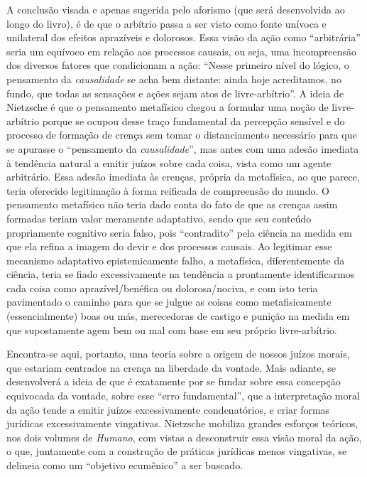 \documentclass[
	12pt,				%
	openright,			%
	oneside,			%
	a4paper,			%
	english,			%
	french,				%
	spanish,			%
	brazil				%
	]{abntex2}
\begin{document}
A conclusão visada e apenas sugerida pelo aforismo (que será desenvolvida ao longo do livro), é de que o arbítrio passa a ser visto como fonte unívoca e unilateral dos efeitos aprazíveis e dolorosos. Essa visão da ação como “arbitrária” seria um equívoco em relação aos processos causais, ou seja, uma incompreensão dos diversos fatores que condicionam a ação: “Nesse primeiro nível do lógico, o pensamento da \textit{causalidade} se acha bem distante: ainda hoje acreditamos, no fundo, que todas as sensações e ações sejam atos de livre-arbítrio”. A ideia de Nietzsche é que o pensamento metafísico chegou a formular uma noção de livre-arbítrio porque se ocupou desse traço fundamental da percepção sensível e do processo de formação de crença sem tomar o distanciamento necessário para que se apurasse o “pensamento da \textit{causalidade}”, mas antes com uma adesão imediata à tendência natural a emitir juízos sobre cada coisa, vista como um agente arbitrário. Essa adesão imediata às crenças, própria da metafísica, ao que parece, teria oferecido legitimação à forma reificada de compreensão do mundo. O pensamento metafísico não teria dado conta do fato de que as crenças assim formadas teriam valor meramente adaptativo, sendo que seu conteúdo propriamente cognitivo seria falso, pois “contradito” pela ciência na medida em que ela refina a imagem do devir e dos processos causais. Ao legitimar esse mecanismo adaptativo epistemicamente falho, a metafísica, diferentemente da ciência, teria se fiado excessivamente na tendência a prontamente identificarmos cada coisa como aprazível/benéfica ou dolorosa/nociva, e com isto teria pavimentado o caminho para que se julgue as coisas como metafisicamente (essencialmente) boas ou más, merecedoras de castigo e punição na medida em que supostamente agem bem ou mal com base em seu próprio livre-arbítrio.

Encontra-se aqui, portanto, uma teoria sobre a origem de nossos juízos morais, que estariam centrados na crença na liberdade da vontade. Mais adiante, se desenvolverá a ideia de que é exatamente por se fundar sobre essa concepção equivocada da vontade, sobre esse “erro fundamental”, que a interpretação moral da ação tende a emitir juízos excessivamente condenatórios, e criar formas jurídicas excessivamente vingativas. Nietzsche mobiliza grandes esforços teóricos, nos dois volumes de \textit{Humano}, com vistas a desconstruir essa visão moral da ação, o que, juntamente com a construção de práticas jurídicas menos vingativas, se delineia como um “objetivo ecumênico” a ser buscado. 
\end{document}
